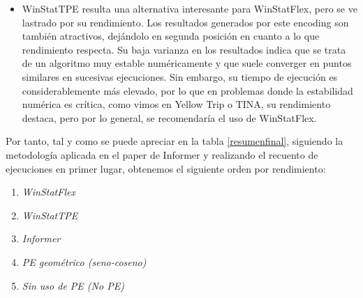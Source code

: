 \begin{itemize}
	 \item WinStatTPE resulta una alternativa interesante para WinStatFlex, pero se ve lastrado por su rendimiento. Los resultados generados por este encoding son también atractivos, dejándolo en segunda posición en cuanto a lo que rendimiento respecta. Su baja varianza en los resultados indica que se trata de un algoritmo muy estable numéricamente y que suele converger en puntos similares en sucesivas ejecuciones. Sin embargo, su tiempo de ejecución es considerablemente más elevado, por lo que en problemas donde la estabilidad numérica es crítica, como vimos en Yellow Trip o TINA, su rendimiento destaca, pero por lo general, se recomendaría el uso de WinStatFlex.
\end{itemize}

Por tanto, tal y como se puede apreciar en la tabla \ref{resumenfinal}, siguiendo la metodología aplicada en el paper de Informer\cite{zhou2021informerefficienttransformerlong} y realizando el recuento de ejecuciones en primer lugar, obtenemos el siguiente orden por rendimiento:

\begin{enumerate}
	\item \textit{WinStatFlex}
	\item \textit{WinStatTPE}
	\item \textit{Informer}
	\item \textit{PE geométrico (seno-coseno)}
	\item \textit{Sin uso de PE (No PE)}
\end{enumerate}

